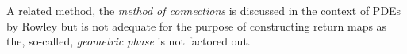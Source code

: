 A related method, the \emph{method of connections} is discussed
in the context of PDEs by Rowley \etal{} but
is not adequate for the purpose of constructing return maps as
the, so-called, \emph{geometric phase} is not factored out.
%

\renewcommand{\Group}{\ensuremath{\Gamma}}    %
